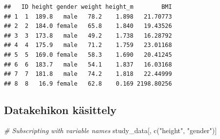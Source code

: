 \documentclass[
]{book}
\newenvironment{Shaded}{\begin{snugshade}}{\end{snugshade}}
\newcommand{\CommentTok}[1]{\textcolor[rgb]{0.56,0.35,0.01}{\textit{#1}}}
\newcommand{\DecValTok}[1]{\textcolor[rgb]{0.00,0.00,0.81}{#1}}
\newcommand{\FloatTok}[1]{\textcolor[rgb]{0.00,0.00,0.81}{#1}}
\newcommand{\FunctionTok}[1]{\textcolor[rgb]{0.00,0.00,0.00}{#1}}
\newcommand{\NormalTok}[1]{#1}
\newcommand{\OtherTok}[1]{\textcolor[rgb]{0.56,0.35,0.01}{#1}}
\newcommand{\SpecialCharTok}[1]{\textcolor[rgb]{0.00,0.00,0.00}{#1}}
\newcommand{\StringTok}[1]{\textcolor[rgb]{0.31,0.60,0.02}{#1}}
\begin{document}
\begin{Shaded}
\end{Shaded}

\begin{verbatim}
##   ID height gender weight height_m        BMI
## 1  1  189.8   male   78.2    1.898   21.70773
## 2  2  184.0 female   65.8    1.840   19.43526
## 3  3  173.8   male   49.2    1.738   16.28792
## 4  4  175.9   male   71.2    1.759   23.01168
## 5  5  169.0 female   58.3    1.690   20.41245
## 6  6  183.7   male   54.1    1.837   16.03168
## 7  7  181.8   male   74.2    1.818   22.44999
## 8  8   16.9 female   62.8    0.169 2198.80256
\end{verbatim}

\hypertarget{datakehikon-kuxe4sittely}{%
\subsection{Datakehikon käsittely}\label{datakehikon-kuxe4sittely}}

\begin{Shaded}
\begin{Highlighting}[]
\CommentTok{\# Subscripting with variable names}
\NormalTok{study\_data[, }\FunctionTok{c}\NormalTok{(}\StringTok{"height"}\NormalTok{, }\StringTok{"gender"}\NormalTok{)]}
\end{Highlighting}
\end{Shaded}
\end{document}
